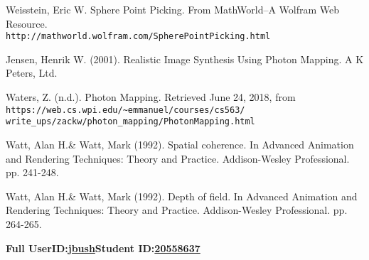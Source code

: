 \documentclass {article}
\begin{document}
\begin{description}
\begin{thebibliography}{15}
Weisstein, Eric W. Sphere Point Picking. From MathWorld--A Wolfram Web Resource.\\ \texttt{http://mathworld.wolfram.com/SpherePointPicking.html}

Jensen, Henrik W. (2001). Realistic Image Synthesis Using Photon Mapping. A K Peters, Ltd.

Waters, Z. (n.d.). Photon Mapping. Retrieved June 24, 2018, from\\ \texttt{https://web.cs.wpi.edu/\textasciitilde emmanuel/courses/cs563/\\write\_ups/zackw/photon\_mapping/PhotonMapping.html}




Watt, Alan H.\& Watt, Mark (1992). Spatial coherence. In Advanced Animation and Rendering Techniques: Theory and Practice. Addison-Wesley Professional. pp. 241-248.

Watt, Alan H.\& Watt, Mark (1992). Depth of field. In Advanced Animation and Rendering Techniques: Theory and Practice. Addison-Wesley Professional. pp. 264-265.




\end{thebibliography}
\endgroup

\end{description}
\newpage



{\hfill{\bf Full UserID:\hspace{0.2in}\underline{\hspace{0.5in}jbush\hspace{0.5in}}}\hfill{\bf Student ID:\hspace{0.2in}\underline{\hspace{0.4in}20558637\hspace{0.4in}}}\hfill}
\end{document}
